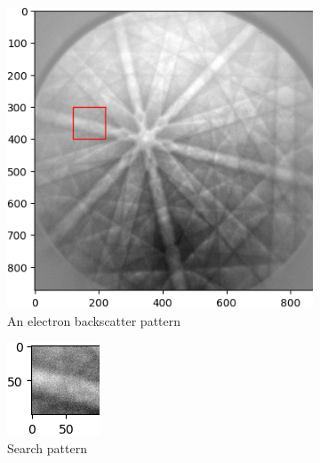 \begin{figure}
	\centering
	\begin{subfigure}{.5\textwidth}
		\centering
		\includegraphics[width=\linewidth]{img/normalized_initial}
		\caption{An electron backscatter pattern}
		\label{normalized-initial}
	\end{subfigure}
	\begin{subfigure}{.4\textwidth}
		\centering
		\includegraphics[width=0.4\linewidth]{img/normalized_pattern}
		\caption{Search pattern}
		\label{normalized-pattern}
	\end{subfigure}
	\begin{subfigure}{.49\textwidth}
		\centering

\end{subfigure}
\end{figure}
